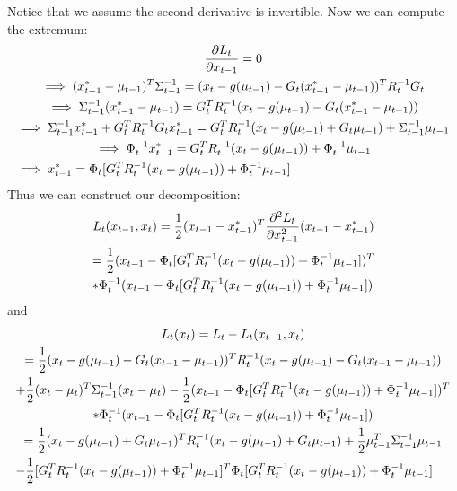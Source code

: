 Notice that we assume the second derivative is invertible. Now we can compute the extremum:
\begin{multline}
\frac{\partial L_t}{\partial x_{t-1}} = 0 \\
\implies (x_{t-1}^* - \mu_{t-1})^T \Sigma_{t-1}^{-1} = (x_t - g(\mu_{t-1}) - G_t (x_{t-1}^* - \mu_{t-1}))^T R_t^{-1} G_t \\
\implies \Sigma_{t-1}^{-1} (x_{t-1}^* - \mu_{t-1}) = G_t^T R_t^{-1}  (x_t - g(\mu_{t-1}) - G_t (x_{t-1}^* - \mu_{t-1})) \\
\implies \Sigma_{t-1}^{-1} x_{t-1}^* + G_t^T R_t^{-1}G_t x_{t-1}^* = G_t^T R_t^{-1}  (x_t - g(\mu_{t-1}) + G_t \mu_{t-1}) + \Sigma_{t-1}^{-1} \mu_{t-1} \\
\implies \Phi_t^{-1} x_{t-1}^* = G_t^T R_t^{-1}  (x_t - g(\mu_{t-1})) + \Phi_t^{-1} \mu_{t-1} \\
\implies x_{t-1}^* = \Phi_t [G_t^T R_t^{-1}  (x_t - g(\mu_{t-1})) + \Phi_t^{-1} \mu_{t-1}] \hfill
\end{multline}
Thus we can construct our decomposition:
\begin{multline*}
L_t(x_{t-1},x_t) = \frac{1}{2} (x_{t-1} - x_{t-1}^*)^T \frac{\partial^2 L_t}{\partial x_{t-1}^2} (x_{t-1} - x_{t-1}^*) \\
= \frac{1}{2} (x_{t-1} - \Phi_t [G_t^T R_t^{-1}  (x_t - g(\mu_{t-1})) + \Phi_t^{-1} \mu_{t-1}])^T \\
* \Phi_t^{-1} (x_{t-1} - \Phi_t [G_t^T R_t^{-1}  (x_t - g(\mu_{t-1})) + \Phi_t^{-1} \mu_{t-1}]) \hfill
\end{multline*}
and
\begin{multline} \label{eqDefLtxt}
L_t(x_t) = L_t -  L_t(x_{t-1},x_t) \\
= \frac{1}{2} (x_t - g(\mu_{t-1}) - G_t (x_{t-1} - \mu_{t-1}))^T R_t^{-1} (x_t - g(\mu_{t-1}) - G_t (x_{t-1} - \mu_{t-1}))\\
+ \frac{1}{2} (x_t - \mu_t)^T \Sigma_{t-1}^{-1} (x_t - \mu_t) - \frac{1}{2} (x_{t-1} - \Phi_t [G_t^T R_t^{-1}  (x_t - g(\mu_{t-1})) + \Phi_t^{-1} \mu_{t-1}])^T \\
* \Phi_t^{-1} (x_{t-1} - \Phi_t [G_t^T R_t^{-1}  (x_t - g(\mu_{t-1})) + \Phi_t^{-1} \mu_{t-1}]) \\
= \frac{1}{2} (x_t - g(\mu_{t-1}) + G_t \mu_{t-1})^T R_t^{-1} (x_t - g(\mu_{t-1}) + G_t \mu_{t-1}) + \frac{1}{2} \mu_{t-1}^T \Sigma_{t-1}^{-1} \mu_{t-1} \\
- \frac{1}{2} [G_t^T R_t^{-1}  (x_t - g(\mu_{t-1})) + \Phi_t^{-1} \mu_{t-1}]^T \Phi_t [G_t^T R_t^{-1}  (x_t - g(\mu_{t-1})) + \Phi_t^{-1} \mu_{t-1}] \hfill
\end{multline}
